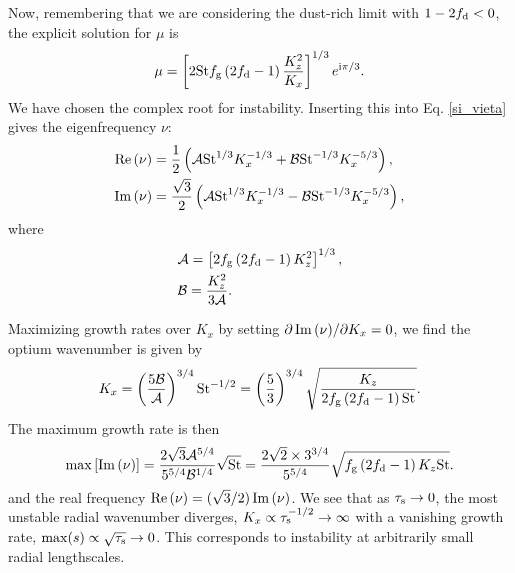 Now, remembering that we are considering the dust-rich limit with 
$1-2f_\mathrm{d}<0$, the explicit solution for $\mu$ is    
\begin{align}
\mu = \left[2\mathrm{St}f_\mathrm{g} \left(2f_\mathrm{d}
    -1\right)\frac{K_z^2}{K_x}\right]^{1/3}e^{\mathrm{i}\pi/3}. \label{mu_explicit} 
\end{align}
We have chosen the complex root for instability. Inserting this into
Eq. \ref{si_vieta} gives the eigenfrequency $\nu$:
\begin{align}
\real{(\nu)} %
&= \frac{1}{2}\left(\calA \st^{1/3}K_x^{-1/3} + \calB
    \st^{-1/3}K_x^{-5/3}\right),\\
\imag{(\nu)} %
&= \frac{\sqrt{3}}{2}\left(\calA \st^{1/3}K_x^{-1/3} - \calB
    \st^{-1/3}K_x^{-5/3}\right),
\end{align}
where
\begin{align}
  &\mathcal{A} = \left[2f_\mathrm{g} \left(2f_\mathrm{d}
      -1\right)K_z^2\right]^{1/3} ,\\
  &\mathcal{B} = \frac{K_z^2}{3\mathcal{A}}. 
\end{align}

Maximizing growth rates over $K_x$ by setting $\partial \operatorname{Im}{(\nu)}/\partial K_x
= 0$, we find the optium wavenumber is given by
\begin{align}
  K_x = \left(\frac{5\mathcal{B}}{\mathcal{A}}\right)^{3/4}\mathrm{St}^{-1/2} =
  \left(\frac{5}{3}\right)^{3/4}\sqrt{\frac{K_z}{2f_\mathrm{g}\left(2f_\mathrm{d}-1\right)\mathrm{St}}}. \label{si_dust_rich_optkx}
\end{align}
The maximum growth rate is then 
\begin{align}
  \mathrm{max}\left[\operatorname{Im}{(\nu)}\right] =
  \frac{2\sqrt{3}\mathcal{A}^{5/4}}{5^{5/4}\mathcal{B}^{1/4}}\sqrt{\mathrm{St}} =
  \frac{2\sqrt{2}\times3^{3/4}}{5^{5/4}}\sqrt{f_\mathrm{g}\left(2f_\mathrm{d}-1\right)K_z\mathrm{St}}.\label{si_dust_rich_grow}
\end{align}
and the real frequency $\operatorname{Re}{(\nu)} =
(\sqrt{3}/2)\operatorname{Im}{(\nu)}$. We see that as $\tau_\mathrm{s}\to0$, the most unstable
radial wavenumber diverges, $K_x\propto \tau_\mathrm{s}^{-1/2} \to \infty$ with 
a vanishing growth rate, $\mathrm{max}(s)\propto \sqrt{\tau_\mathrm{s}}\to
0$. This corresponds to instability at arbitrarily small radial
lengthscales.    

